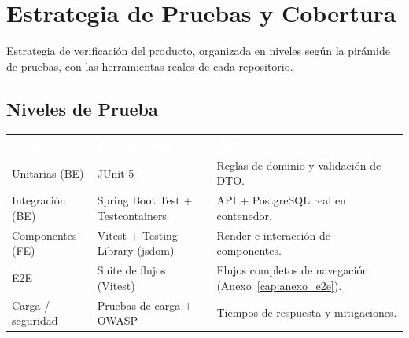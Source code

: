 \chapter{Estrategia de Pruebas y Cobertura}
\label{cap:anexo_pruebas}

Estrategia de verificación del producto, organizada en niveles según la pirámide de pruebas, con
las herramientas reales de cada repositorio.\par

\section{Niveles de Prueba}
\label{sec:anexo_pruebas_niveles}
\renewcommand{\arraystretch}{1.3}
\fontsize{9}{10.8}\selectfont\sffamily
\noindent
\begin{tabularx}{\textwidth}{|l|X|l|}
\hline
\rowcolor{colorPrimario}
\textcolor{white}{\textbf{Nivel}} & \textcolor{white}{\textbf{Herramientas}} & \textcolor{white}{\textbf{Ámbito}} \\ \hline
Unitarias (BE) & JUnit 5 & Reglas de dominio y validación de DTO. \\ \hline
\rowcolor{grisTecnico}
Integración (BE) & Spring Boot Test + Testcontainers & API + PostgreSQL real en contenedor. \\ \hline
Componentes (FE) & Vitest + Testing Library (jsdom) & Render e interacción de componentes. \\ \hline
\rowcolor{grisTecnico}
E2E & Suite de flujos (Vitest) & Flujos completos de navegación (Anexo~\ref{cap:anexo_e2e}). \\ \hline
Carga / seguridad & Pruebas de carga + OWASP & Tiempos de respuesta y mitigaciones. \\ \hline
\end{tabularx}\normalfont\normalsize
\par\vspace{0.3cm}

